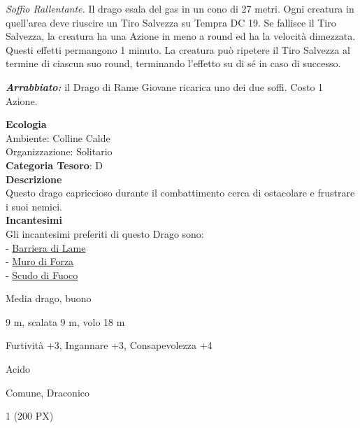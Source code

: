 \begin{multicols}{2}
{\emph{Soffio Rallentante.} Il drago esala del gas in un cono di 27 metri. Ogni creatura in quell'area deve riuscire un Tiro Salvezza su Tempra DC 19. Se fallisce il Tiro Salvezza, la creatura ha una Azione in meno a round ed ha la velocità dimezzata. Questi effetti permangono 1 minuto. La creatura può ripetere il Tiro Salvezza al termine di ciascun suo round, terminando l'effetto su di sé in caso di successo.

\emph{\textbf{Arrabbiato:}} il Drago di Rame Giovane ricarica uno dei due soffi. Costo 1 Azione.

\textbf{Ecologia}\\
Ambiente: Colline Calde\\
Organizzazione: Solitario\\
\textbf{Categoria Tesoro}: D\\
\textbf{Descrizione}\\
Questo drago capriccioso durante il combattimento cerca di ostacolare e frustrare i suoi nemici.\\
\textbf{Incantesimi}\\
Gli incantesimi preferiti di questo Drago sono:\\
- \hyperlink{Barriera di Lame}{Barriera di Lame}\\
- \hyperlink{Muro di Forza}{Muro di Forza}\\
- \hyperlink{Scudo di Fuoco}{Scudo di Fuoco}

\begin{description}[noitemsep, topsep=0pt, parsep=0pt, partopsep=0pt, itemsep=1pt, leftmargin=2.35cm,  labelwidth=2.2cm, itemindent=0cm, listparindent=0pt] %
\setlength{\baselineskip}{10pt}
\item[\textbf{Taglia/Tipo}] Media drago, buono
\item[\textbf{Caratt.}] 
\item[\textbf{Punti Ferita}] 
\item[\textbf{Movimento}] 9 m, scalata 9 m, volo 18 m
\item[\textbf{Tiri Salvez.}] 
\item[\textbf{Comp.}] Furtività +3, Ingannare +3, Consapevolezza +4
\item[\textbf{Imm. Danni}] Acido
\item[\textbf{Sensi}] 
\item[\textbf{Linguaggi}] Comune, Draconico
\item[\textbf{Sfida}] 1 (200 PX)
\end{description}
\smallskip

}
\end{multicols}
